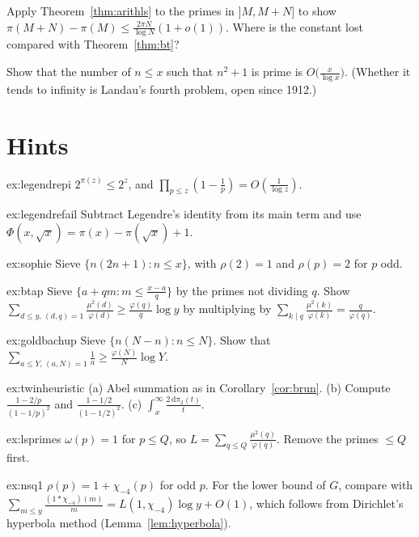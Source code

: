 \begin{exercise}[$\star$]\label{ex:lsprimes}
Apply Theorem~\ref{thm:arithls} to the primes in $]M,M+N]$ to show $\pi(M+N)-\pi(M)\le\frac{2\pi N}{\log N}(1+o(1))$. Where is the constant lost compared with Theorem~\ref{thm:bt}?
\end{exercise}

\begin{exercise}[$\star\star\star$]\label{ex:nsq1}
Show that the number of $n\le x$ such that $n^2+1$ is prime is $O\bigl(\frac x{\log x}\bigr)$. (Whether it tends to infinity is Landau's fourth problem, open since 1912.)
\end{exercise}

\section{Hints}

\begin{hint}{ex:legendrepi}
$2^{\pi(z)}\le2^z$, and $\prod_{p\le z}(1-\frac1p)=O(\frac1{\log z})$.
\end{hint}
\begin{hint}{ex:legendrefail}
Subtract Legendre's identity from its main term and use $\Phi(x,\sqrt x)=\pi(x)-\pi(\sqrt x)+1$.
\end{hint}
\begin{hint}{ex:sophie}
Sieve $\{n(2n+1):n\le x\}$, with $\rho(2)=1$ and $\rho(p)=2$ for $p$ odd.
\end{hint}
\begin{hint}{ex:btap}
Sieve $\{a+qm:m\le\frac{x-a}q\}$ by the primes not dividing $q$. Show $\sum_{d\le y,\,(d,q)=1}\frac{\mu^2(d)}{\varphi(d)}\ge\frac{\varphi(q)}q\log y$ by multiplying by $\sum_{k\mid q}\frac{\mu^2(k)}{\varphi(k)}=\frac q{\varphi(q)}$.
\end{hint}
\begin{hint}{ex:goldbachup}
Sieve $\{n(N-n):n\le N\}$. Show that $\sum_{a\le Y,\,(a,N)=1}\frac1a\ge\frac{\varphi(N)}N\log Y$.
\end{hint}
\begin{hint}{ex:twinheuristic}
(a) Abel summation as in Corollary~\ref{cor:brun}. (b) Compute $\frac{1-2/p}{(1-1/p)^2}$ and $\frac{1-1/2}{(1-1/2)^2}$. (c) $\int_x^\infty\frac{2\,\mathrm d\pi_2(t)}t$.
\end{hint}
\begin{hint}{ex:lsprimes}
$\omega(p)=1$ for $p\le Q$, so $L=\sum_{q\le Q}\frac{\mu^2(q)}{\varphi(q)}$. Remove the primes $\le Q$ first.
\end{hint}
\begin{hint}{ex:nsq1}
$\rho(p)=1+\chi_{-4}(p)$ for odd $p$. For the lower bound of $G$, compare with $\sum_{m\le y}\frac{(1*\chi_{-4})(m)}m=L(1,\chi_{-4})\log y+O(1)$, which follows from Dirichlet's hyperbola method (Lemma~\ref{lem:hyperbola}).
\end{hint}

